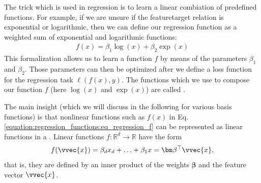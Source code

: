 \documentclass[letterpaper,10pt,english]{jupyterBook}
\begin{document}
\sphinxAtStartPar
The trick which is used in regression is to learn a linear combiation of predefined functions. For example, if we are unsure if the feature\sphinxhyphen{}target relation is exponential or logarithmic, then we can define our regression function as a weighted sum of exponential and logarithmic functions:
\begin{equation}\label{equation:regression_functions:eq_regression_f}
\begin{split}f(x) = \beta_1 \log(x) + \beta_2 \exp(x) \end{split}
\end{equation}
\sphinxAtStartPar
This formalization allows us to learn a function \(f\) by means of the parameters \(\beta_1\) and \(\beta_2\). Those parameters can then be optimized after we define a loss function for the regression task \(\ell(f(x),y)\). The functions which we use to compose our function \(f\) (here \(\log(x)\) and \(\exp(x)\)) are called .

\sphinxAtStartPar
The  main insight (which we will discuss in the following for various basis functions) is that nonlinear functions such as \(f(x)\) in Eq. \eqref{equation:regression_functions:eq_regression_f} can be represented as linear functions in a . Linear functions \(f:\mathbb{R}^d\rightarrow \mathbb{R}\) have the form
\begin{equation*}
\begin{split}f(\vvec{x}) = \beta_d x_d + \ldots + \beta_1x = \bm\beta^\top \vvec{x},\end{split}
\end{equation*}
that is, they are defined by an inner product of the weights \(\bm\beta\) and the feature vector \(\vvec{x}\).
\end{document}

